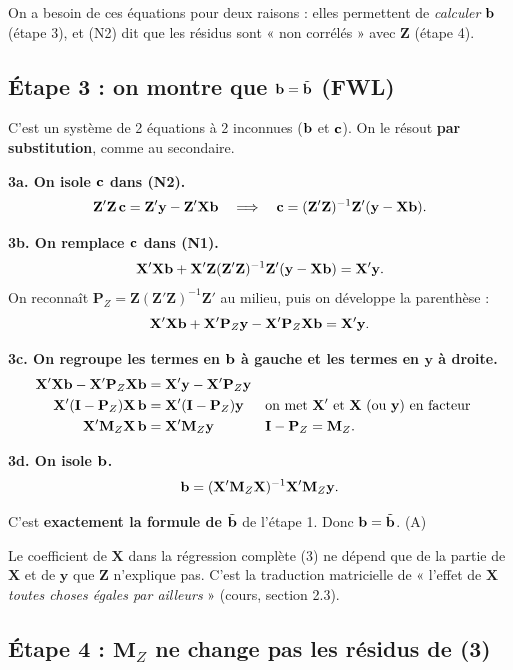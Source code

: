 \documentclass[11pt,a4paper]{article}
\newcommand{\vy}{\mathbf{y}}\newcommand{\vX}{\mathbf{X}}\newcommand{\vZ}{\mathbf{Z}}
\newcommand{\I}{\mathbf{I}}
\newcommand{\Mz}{\mathbf{M}_Z}\newcommand{\Pz}{\mathbf{P}_Z}
\begin{document}
\begin{pourquoi}
On a besoin de ces équations pour deux raisons : elles permettent de \emph{calculer} $\mathbf{b}$ (étape 3), et (N2) dit que les résidus sont « non corrélés » avec $\vZ$ (étape 4).
\end{pourquoi}

\subsection*{Étape 3 : on montre que $\mathbf{b}=\tilde{\mathbf{b}}$ (FWL)}

C'est un système de 2 équations à 2 inconnues ($\mathbf{b}$ et $\mathbf{c}$). On le résout \textbf{par substitution}, comme au secondaire.

\textbf{3a. On isole $\mathbf{c}$ dans (N2).}
\[
\vZ'\vZ\,\vc=\vZ'\vy-\vZ'\vX\vb
\quad\Longrightarrow\quad
\vc=(\vZ'\vZ)^{-1}\vZ'(\vy-\vX\vb).
\]

\textbf{3b. On remplace $\mathbf{c}$ dans (N1).}
\[
\vX'\vX\vb+\vX'\vZ(\vZ'\vZ)^{-1}\vZ'(\vy-\vX\vb)=\vX'\vy .
\]
On reconnaît $\Pz=\vZ(\vZ'\vZ)^{-1}\vZ'$ au milieu, puis on développe la parenthèse :
\[
\vX'\vX\vb+\vX'\Pz\vy-\vX'\Pz\vX\vb=\vX'\vy .
\]

\textbf{3c. On regroupe les termes en $\mathbf{b}$ à gauche et les termes en $\vy$ à droite.}
\begin{align*}
\vX'\vX\vb-\vX'\Pz\vX\vb&=\vX'\vy-\vX'\Pz\vy\\
\vX'(\I-\Pz)\vX\,\vb&=\vX'(\I-\Pz)\vy && \text{on met } \vX' \text{ et } \vX \text{ (ou } \vy) \text{ en facteur}\\
\vX'\Mz\vX\,\vb&=\vX'\Mz\vy && \I-\Pz=\Mz .
\end{align*}

\textbf{3d. On isole $\mathbf{b}$.}
\[
\vb=(\vX'\Mz\vX)^{-1}\vX'\Mz\vy .
\]

\begin{resultat}
C'est \textbf{exactement la formule de $\tilde{\mathbf{b}}$} de l'étape 1. Donc $\mathbf{b}=\tilde{\mathbf{b}}$. \hfill (A) \checkmark
\end{resultat}

\begin{pourquoi}
Le coefficient de $\vX$ dans la régression complète (3) ne dépend que de la partie de $\vX$ et de $\vy$ que $\vZ$ n'explique pas. C'est la traduction matricielle de « l'effet de $\vX$ \emph{toutes choses égales par ailleurs} » (cours, section 2.3).
\end{pourquoi}

\subsection*{Étape 4 : $\Mz$ ne change pas les résidus de (3)}
\end{document}
